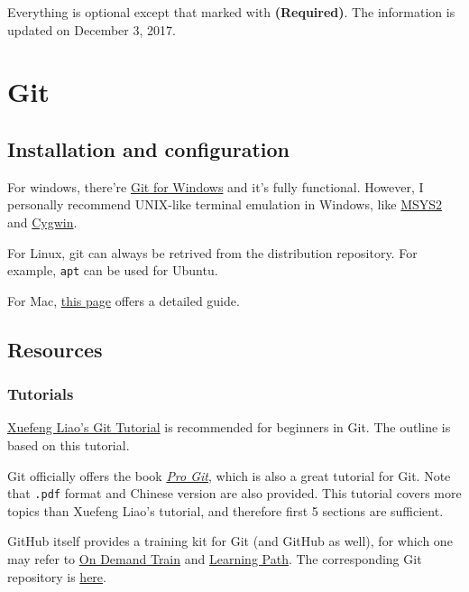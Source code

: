 \documentclass[english]{pkupaper}
\title{\titlemark}
\author{pppppass}
\date{\today}
\begin{document}
	\maketitle

Everything is optional except that marked with \textbf{(Required)}. The information is updated on December 3, 2017.

\section{Git}

\subsection{Installation and configuration}

For windows, there're \href{https://git-for-windows.github.io/}{Git for Windows} and it's fully functional. However, I personally recommend UNIX-like terminal emulation in Windows, like \href{http://www.msys2.org/}{MSYS2} and \href{https://www.cygwin.com/}{Cygwin}.

For Linux, git can always be retrived from the distribution repository. For example, \verb"apt" can be used for Ubuntu.

For Mac, \href{https://git-scm.com/book/en/v2/Getting-Started-Installing-Git}{this page} offers a detailed guide.

\subsection{Resources}

\subsubsection{Tutorials} \label{Sssec:Tuto}

\href{https://www.liaoxuefeng.com/wiki/0013739516305929606dd18361248578c67b8067c8c017b000/}{Xuefeng Liao's Git Tutorial} is recommended for beginners in Git. The outline is based on this tutorial.

Git officially offers the book \href{https://git-scm.com/book/en/v2}{\emph{Pro Git}}, which is also a great tutorial for Git. Note that \verb".pdf" format and Chinese version are also provided. This tutorial covers more topics than Xuefeng Liao's tutorial, and therefore first 5 sections are sufficient.

GitHub itself provides a training kit for Git (and GitHub as well), for which one may refer to \href{https://services.github.com/on-demand/}{On Demand Train} and \href{https://services.github.com/on-demand/resources/learning-path/}{Learning Path}. The corresponding Git repository is \href{https://github.com/github/training-kit}{here}.
\end{document}
